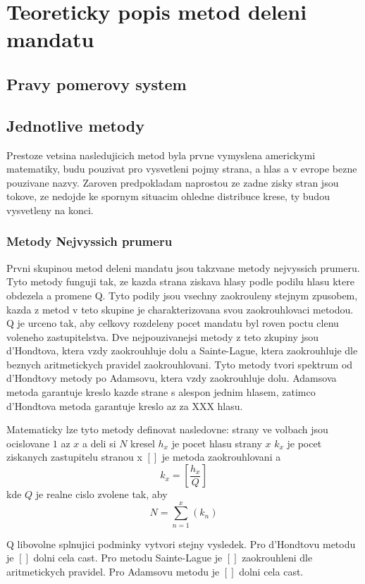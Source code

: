 \documentclass[12pt,a4paper]{report}
\begin{document}
\chapter{Teoreticky popis metod deleni mandatu}

\section{Pravy pomerovy system} %

\section{Jednotlive metody}
Prestoze vetsina nasledujicich metod byla prvne vymyslena americkymi matematiky, budu pouzivat pro vysvetleni pojmy strana, a hlas a v evrope bezne pouzivane nazvy.
Zaroven predpokladam naprostou ze zadne zisky stran jsou tokove, ze nedojde ke spornym situacim ohledne distribuce krese, ty budou vysvetleny na konci. 

\subsection{Metody Nejvyssich prumeru}
Prvni skupinou metod deleni mandatu jsou takzvane metody nejvyssich prumeru.
Tyto metody funguji tak, ze kazda strana ziskava hlasy podle podilu hlasu ktere obdezela a promene Q.
Tyto podily jsou vsechny zaokrouleny stejnym zpusobem, kazda z metod v teto skupine je charakterizovana svou zaokrouhlovaci metodou.
Q je urceno tak, aby celkovy rozdeleny pocet mandatu byl roven poctu clenu voleneho zastupitelstva.
Dve nejpouzivanejsi metody z teto zkupiny jsou d'Hondtova, ktera vzdy zaokrouhluje dolu a Sainte-Lague, ktera zaokrouhluje dle beznych aritmetickych pravidel zaokrouhlovani.
Tyto metody tvori spektrum od d'Hondtovy metody po Adamsovu, ktera vzdy zaokrouhluje dolu. %
Adamsova metoda garantuje kreslo kazde strane s alespon jednim hlasem, zatimco d'Hondtova metoda garantuje kreslo az za XXX hlasu.

Matematicky lze tyto metody definovat nasledovne:
strany ve volbach jsou ocislovane $1$ az $x$ a deli si $N$ kresel
$h_{x}$ je pocet hlasu strany $x$
$k_{x}$ je pocet ziskanych zastupitelu stranou x
$[]$ je metoda zaokrouhlovani
a
$$k_{x}=[\dfrac{h_{x}}{Q}]$$ kde $Q$ je realne cislo zvolene tak, aby $$N=\sum_{n=1}^{x} (k_{n})$$ 

Q libovolne splnujici podminky vytvori stejny vysledek. %
Pro d'Hondtovu metodu je $[ ]$ dolni cela cast.
Pro metodu Sainte-Lague je $[ ]$ zaokrouhleni dle aritmetickych pravidel.
Pro Adamsovu metodu je $[ ]$ dolni cela cast.
\end{document}

